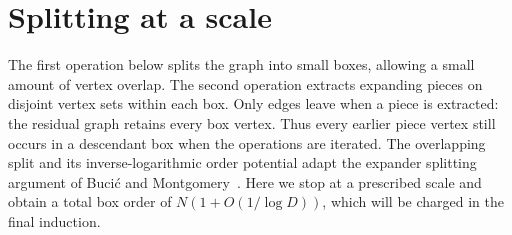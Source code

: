 \section{Splitting at a scale}
\label{sec:splitting}

The first operation below splits the graph into small boxes, allowing a
small amount of vertex overlap.  The second operation extracts expanding
pieces on disjoint vertex sets within each box.  Only edges leave when a
piece is extracted: the residual graph retains every box vertex.  Thus
every earlier piece vertex still occurs in a descendant box when the
operations are iterated.  The overlapping split
and its inverse-logarithmic order potential adapt the expander
splitting argument of Buci\'c and Montgomery~\cite[Lemma~14]{BM2024}.
Here we stop at a prescribed scale and obtain a total box order
of \(N(1+O(1/\log D))\), which will be charged in the final induction.

